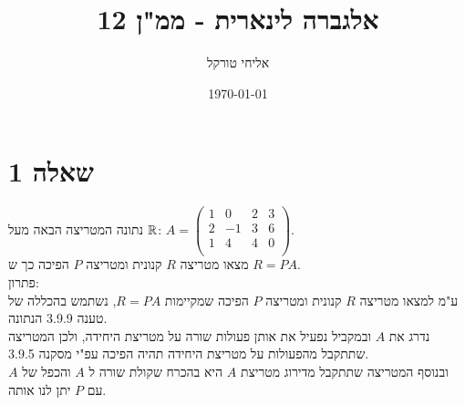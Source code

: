 \documentclass{article}
\title{אלגברה לינארית - ממ"ן 12}
\author{אליחי טורקל \ID}
\date\today
\begin{document}
	\maketitle %

	\section*{שאלה 1}
	נתונה המטריצה הבאה מעל $\mathbb{R}$:
	$A = \begin{pmatrix}
		1 & 0 & 2 & 3 \\
		2 & -1 & 3 & 6 \\
		1 & 4 & 4 & 0 \\
	\end{pmatrix}$. \\
	מצאו מטריצה $R$ קנונית ומטריצה $P$ הפיכה כך ש $R = PA$. \\
	פתרון: \\
	ע"מ למצאו מטריצה $R$ קנונית ומטריצה $P$ הפיכה שמקיימות $R = PA$, נשתמש בהכללה של טענה 3.9.9 הנתונה. \\
	נדרג את $A$ ובמקביל נפעיל את אותן פעולות שורה על מטריצת היחידה, ולכן המטריצה שתתקבל מהפעולות על מטריצת היחידה תהיה הפיכה עפ"י מסקנה 3.9.5.\\
	ובנוסף המטריצה שתתקבל מדירוג מטריצת $A$ היא בהכרח שקולת שורה ל $A$ והכפל של $A$ עם $P$ יתן לנו אותה.
\end{document}
